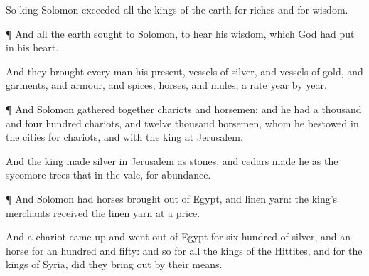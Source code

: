{So
king
Solomon
exceeded all the
kings of the
earth for
riches and for
wisdom.


\par }{\PP {}¶ And all the
earth
sought
to
Solomon, to
hear his
wisdom, which
God had
put in his
heart.

And they
brought every
man his
present,
vessels of
silver, and
vessels of
gold, and
garments, and
armour, and
spices,
horses, and
mules, a
rate
year by
year.


\par }{\PP {}¶ And
Solomon gathered
together
chariots and
horsemen: and he had a
thousand and
four
hundred
chariots, and
twelve
thousand
horsemen, whom he
bestowed in the
cities for
chariots, and with the
king at
Jerusalem.

And the
king
made
silver
{} in
Jerusalem as
stones, and
cedars
made he
{} as the sycomore
trees that
{} in the
vale, for
abundance.


\par }{\PP {}¶ And
Solomon had
horses
brought out of
Egypt, and linen
yarn: the
king’s
merchants
received the linen
yarn at a
price.

And a
chariot came
up and went
out of
Egypt for
six
hundred
{} of
silver, and an
horse for an
hundred and
fifty: and so for all the
kings of the
Hittites, and for the
kings of
Syria, did they bring
{}
out by their
means.




\par }
